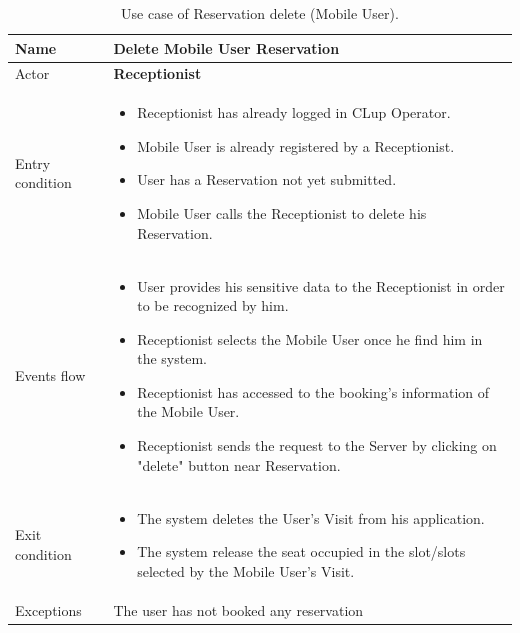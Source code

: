 \begin{table}[H]\begin{tabular}{|p{5cm} | p{7cm} | }
	\hline
	Name & \textbf{Delete Mobile User Reservation} \\
	\hline
	Actor & \textbf{Receptionist} \\
	\hline
	Entry condition &
	\begin{itemize}
		\item Receptionist has already logged in CLup Operator. 
 		\item Mobile User is already registered by a Receptionist.
		\item User has a Reservation not yet submitted. 
        \item Mobile User calls the Receptionist to delete his Reservation.
	\end{itemize} \\
	\hline
	Events flow & 
	\begin{itemize}
		\item User provides his sensitive data to the Receptionist in order to be recognized by him. 
        \item Receptionist selects the Mobile User once he find him in the system.
		\item Receptionist has accessed to the booking's information of the Mobile User.
        \item Receptionist sends the request to the Server by clicking on "delete" button near Reservation.
	\end{itemize} \\
	\hline
	Exit condition & \begin{itemize}
	\item The system deletes the User’s Visit from his application.
    \item The system release the seat occupied in the slot/slots selected by the Mobile User’s Visit. \end{itemize} \\
	\hline 
	Exceptions & 
	The user has not booked any reservation \\
	\hline
\end{tabular}
\caption{Use case of Reservation delete (Mobile User).}
\end{table}
\bigbreak

